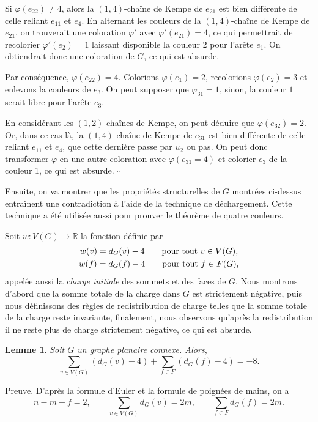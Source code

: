 \documentclass[10pt,a4paper]{article}
\newtheorem{lemme}{Lemme}
\newcommand{\ep}{{\hfill $\square$}}
\begin{document}
Si $\varphi(e_{22}) \ne 4$, alors la $(1,4)$-chaîne de Kempe de $e_{21}$ est bien différente de celle reliant $e_{11}$ et $e_4$. En alternant les couleurs de la $(1,4)$-chaîne de Kempe de $e_{21}$, on trouverait une coloration $\varphi'$ avec $\varphi'(e_{21})=4$, ce qui permettrait de recolorier $\varphi'(e_2) = 1$ laissant disponible la couleur $2$ pour l'arête $e_1$. On obtiendrait donc une coloration de $G$, ce qui est absurde. 

Par conséquence, $\varphi(e_{22}) = 4$. Colorions $\varphi(e_1)=2$, recolorions $\varphi(e_2)=3$ et enlevons la couleurs de $e_3$.
On peut supposer que $\varphi_{31}=1$, sinon, la couleur $1$ serait libre pour l'arête $e_3$.

En considérant les $(1,2)$-chaînes de Kempe, on peut déduire que $\varphi(e_{32})=2$. Or, dans ce cas-là, la $(1,4)$-chaîne de Kempe de $e_{31}$ est bien différente de celle reliant $e_{11}$ et $e_4$, que cette dernière passe par $u_2$ ou pas. On peut donc transformer $\varphi$ en une autre coloration avec $\varphi(e_{31}=4)$ et colorier $e_3$ de la couleur 1, ce qui est absurde.
\ep


\bigskip
Ensuite, on va montrer que les propriétés structurelles de $G$ montrées ci-dessus entraînent une contradiction à l'aide de la technique de déchargement. Cette technique a été utilisée aussi pour prouver le théorème de quatre couleurs. 

Soit $w: V(G) \to \mathbb{R}$  la fonction définie par
 $$
 \gathered
 w(v) = d_G(v) - 4 \qquad \textrm{pour tout $v\in V(G)$,} \\
 w(f) = d_G(f) - 4 \qquad \textrm{pour tout $f\in F(G)$,} 
\endgathered 
$$
appelée aussi la \emph{charge initiale} des sommets et des faces de $G$. Nous montrons d'abord que la somme totale de la charge dans $G$ est strictement négative, puis nous définissons des règles de redistribution de charge telles que la somme totale de la charge reste invariante, finalement, nous observons qu'après la redistribution il ne reste plus de charge strictement négative, ce qui est absurde.

\begin{lemme}
Soit $G$ un graphe planaire connexe. Alors,
$$ \sum_{v \in V(G)} (d_G(v) - 4) + \sum_{f\in F} (d_G(f) -4) = -8.$$
\label{le:charge}
\end{lemme}

Preuve.
D'après la formule d'Euler et la formule de poignées de mains, on a
$$ 
n - m + f = 2, \qquad
\sum_{v\in V(G)} d_G(v) = 2m, \qquad
\sum_{f\in F} d_G(f) = 2m. 
$$
\end{document}
